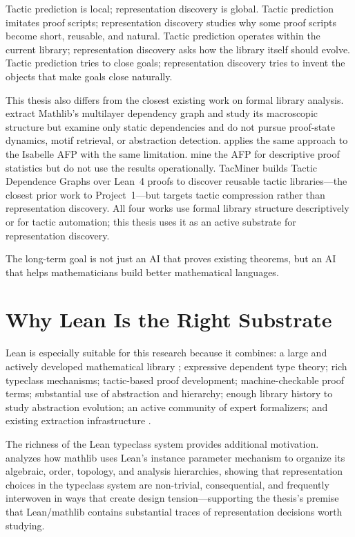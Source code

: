\documentclass[12pt, a4paper]{article}
\begin{document}
Tactic prediction is local; representation discovery is global. Tactic
prediction imitates proof scripts; representation discovery studies why some
proof scripts become short, reusable, and natural. Tactic prediction operates
within the current library; representation discovery asks how the library
itself should evolve. Tactic prediction tries to close goals; representation
discovery tries to invent the objects that make goals close naturally.

This thesis also differs from the closest existing work on formal library
analysis. \citet{li2026networkstructure} extract Mathlib's multilayer
dependency graph and study its macroscopic structure but examine only static
dependencies and do not pursue proof-state dynamics, motif retrieval, or
abstraction detection. \citet{huch2022} applies the same approach to the
Isabelle AFP with the same limitation. \citet{blanchette2015mining} mine the
AFP for descriptive proof statistics but do not use the results operationally.
TacMiner \citep{xin2025tacminer} builds Tactic Dependence Graphs over Lean~4
proofs to discover reusable tactic libraries---the closest prior work to
Project~1---but targets tactic compression rather than representation
discovery. All four works use formal library structure descriptively or for
tactic automation; this thesis uses it as an active substrate for
representation discovery.

The long-term goal is not just an AI that proves existing theorems, but an
AI that helps mathematicians build better mathematical languages.

\section{Why Lean Is the Right Substrate}

Lean is especially suitable for this research because it combines: a large
and actively developed mathematical library \citep{mathlib2020}; expressive
dependent type theory; rich typeclass mechanisms; tactic-based proof
development; machine-checkable proof terms; substantial use of abstraction
and hierarchy; enough library history to study abstraction evolution; an
active community of expert formalizers; and existing extraction infrastructure
\citep{yang2023leandojo, han2021pact}.

The richness of the Lean typeclass system provides additional motivation.
\citet{baanen2022instances} analyzes how mathlib uses Lean's instance
parameter mechanism to organize its algebraic, order, topology, and analysis
hierarchies, showing that representation choices in the typeclass system are
non-trivial, consequential, and frequently interwoven in ways that create
design tension---supporting the thesis's premise that Lean/mathlib contains
substantial traces of representation decisions worth studying.
\end{document}
